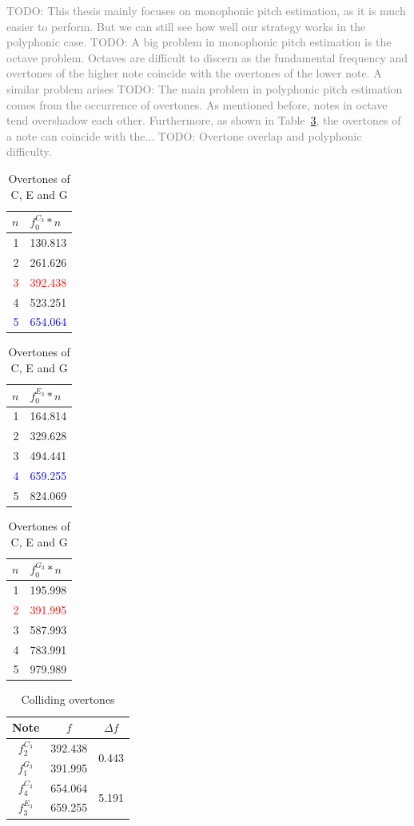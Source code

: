 \documentclass[a4paper,10pt,twocolumn]{article}
\begin{document}
\textcolor{gray}{TODO: This thesis mainly focuses on monophonic pitch estimation, as it is much easier to perform. But we can still see how well our strategy works in the polyphonic case.
TODO: A big problem in monophonic pitch estimation is the octave problem. Octaves are difficult to discern as the fundamental frequency and overtones of the higher note coincide with the overtones of the lower note. A similar problem arises
TODO: The main problem in polyphonic pitch estimation comes from the occurrence of overtones. As mentioned before, notes in octave tend overshadow each other. Furthermore, as shown in Table~\ref{tab:overtones}, the overtones of a note can coincide with the...
TODO: Overtone overlap and polyphonic difficulty.}
\begin{table}[h]
    \centering
    \hfill
    \begin{tabular}{r|l}
        $n$ & $f^{C_3}_0*n$ \\
        \hline
        1 & 130.813 \\
        2 & 261.626 \\
        \textcolor{red}{3} & \textcolor{red}{392.438} \\
        4 & 523.251 \\
        \textcolor{blue}{5} & \textcolor{blue}{654.064}
    \end{tabular}
    \hfill
    \begin{tabular}{r|l}
        $n$ & $f^{E_3}_0*n$ \\
        \hline
        1 & 164.814 \\
        2 & 329.628 \\
        3 & 494.441 \\
        \textcolor{blue}{4} & \textcolor{blue}{659.255} \\
        5 & 824.069
    \end{tabular}
    \hfill
    \begin{tabular}{r|l}
        $n$ & $f^{G_3}_0*n$ \\
        \hline
        1 & 195.998 \\
        \textcolor{red}{2} & \textcolor{red}{391.995} \\
        3 & 587.993 \\
        4 & 783.991 \\
        5 & 979.989
    \end{tabular}
    \hfill
    \caption{Overtones of C, E and G}
    \label{tab:overtones}
\end{table}
\begin{table}[h]
    \centering
    \begin{tabular}{c|c|c}
        Note & $f$ & $\Delta f$ \\
        \hline
        $f^{C_3}_2$ & 392.438 & \multirow{2}{*}{0.443} \\
        $f^{G_3}_1$ & 391.995 & \\
        \hline
        $f^{C_3}_4$ & 654.064 & \multirow{2}{*}{5.191} \\
        $f^{E_3}_3$ & 659.255 &
    \end{tabular}
    \caption{Colliding overtones}
    \label{tab:diff}
\end{table}
\end{document}
